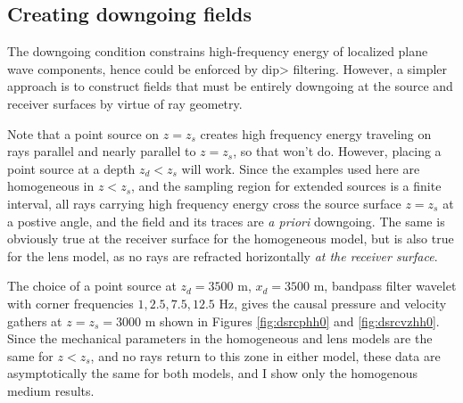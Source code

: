 
\subsection{Creating downgoing fields}
The downgoing condition constrains high-frequency energy of localized
plane wave components, hence could be enforced by dip>
filtering. However, a simpler approach is to construct fields that
must be entirely downgoing at the source and receiver surfaces by
virtue of ray geometry.

Note that a point source
on $z=z_s$ creates high frequency energy traveling on rays parallel
and nearly parallel to $z=z_s$, so that won't do. However, placing a
point source at a depth $z_d<z_s$ will work. Since the examples used here are
homogeneous in $z<z_s$, and the sampling region for extended sources
is a finite interval, all rays carrying high frequency energy cross
the source surface $z=z_s$ at a postive angle, and the field and its
traces are {\em a priori} downgoing. The same is obviously true at the
receiver surface for the homogeneous model, but is also true for the
lens model, as no rays are refracted horizontally {\em at the receiver surface}.

The choice of a point source at
$z_d=3500$ m, $x_d=3500$ m,  bandpass filter wavelet with
corner frequencies $1, 2.5, 7.5, 12.5$ Hz, gives the causal pressure and
velocity gathers at $z=z_s=3000$ m
shown in Figures \ref{fig:dsrcphh0} and \ref{fig:dsrcvzhh0}.  Since the
mechanical parameters in the homogeneous and lens models are the same
for $z<z_s$, and no rays return to this zone in either model, these
data are asymptotically the same for both models, and I show only the
homogenous medium results.



